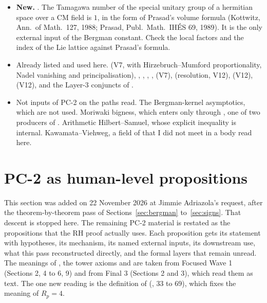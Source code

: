 \documentclass[11pt]{article}
\theoremstyle{remark}
\begin{document}
\begin{itemize}[nosep]
\item \textbf{New.} . The Tamagawa number of the special unitary group of a hermitian space over a CM field is $1$, in the form of Prasad's volume formula (Kottwitz, Ann.\ of Math.\ 127, 1988; Prasad, Publ.\ Math.\ IH\'ES 69, 1989). It is the only external input of the Bergman constant. Check the local factors  and the index of the Lie lattice against Prasad's formula.
\item Already listed and used here.  (V7, with  Hirzebruch--Mumford proportionality,  Nadel vanishing and  principalisation), , , , ,  (V7),  (resolution, V12),  (V12),  (V12), and the Layer-3 conjuncts of .
\item Not inputs of PC-2 on the paths read. The Bergman-kernel asymptotics, which are not used. Moriwaki bigness, which enters only through , one of two producers of . Arithmetic Hilbert--Samuel, whose explicit inequality  is internal. Kawamata--Viehweg, a field of  that I did not meet in a body read here.
\end{itemize}

\section{PC-2 as human-level propositions}\label{sec:props}

This section was added on 22 November 2026 at Jimmie Adriazola's request, after the theorem-by-theorem pass of Sections~\ref{sec:bergman} to~\ref{sec:signs}. That descent is stopped here. The remaining PC-2 material is restated as the propositions that the RH proof actually uses. Each proposition gets its statement with hypotheses, its mechanism, its named external inputs, its downstream use, what this pass reconstructed directly, and the formal layers that remain unread. The meanings of , the tower axioms and  are taken from Focused Wave 1 (Sections 2, 4 to 6, 9) and from Final 3 (Sections 2 and 3), which read them as text. The one new reading is the definition of  (, 33 to 69), which fixes the meaning of $R_p=4$.
\end{document}
